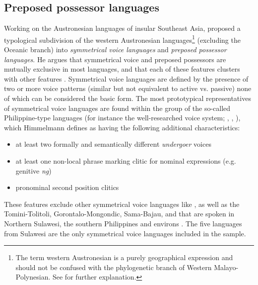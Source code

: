 \subsection{Preposed possessor languages}\label{sec:preposed}

Working on the Austronesian languages of insular Southeast Asia, \citet{Himmelmann2005austronesian} proposed a typological subdivision of the western Austronesian languages\footnote{The term western Austronesian is a purely geographical expression and should not be confused with the phylogenetic branch of Western Malayo-Polynesian. See \citet{Himmelmann2005austronesian} for further explanation.} (excluding the Oceanic branch) into \emph{symmetrical voice languages} and \emph{preposed possessor languages}. He argues that symmetrical voice and preposed possessors are mutually exclusive in most languages, and that each of these features clusters with other features \citep[113]{Himmelmann2005austronesian}. Symmetrical voice languages are defined by the presence of two or more voice patterns (similar but not equivalent to active vs. passive) none of which can be considered the basic form. The most prototypical representatives of symmetrical voice languages are found within the group of the so-called Philippine-type languages (for instance the well-researched  voice system; \citealt{schachter1976subject}, \citealt{Himmelmann2005tagalog}, \citealt{riesberg2014symmetrical}), which Himmelmann defines as having the following additional characteristics:

\begin{itemize}
\item at least two formally and semantically different \textit{undergoer} voices
\item at least one non-local phrase marking clitic for nominal expressions (e.g.  genitive \textit{ng})
\item pronominal second position clitics
\end{itemize}

These features exclude other symmetrical voice languages like ,  as well as the Tomini-Tolitoli, Gorontalo-Mongondic, Sama-Bajau, and  that are spoken in Northern Sulawesi, the southern Philippines and environs \citep[113]{Himmelmann2005austronesian}. The five languages from Sulawesi are the only symmetrical voice languages included in the sample.

